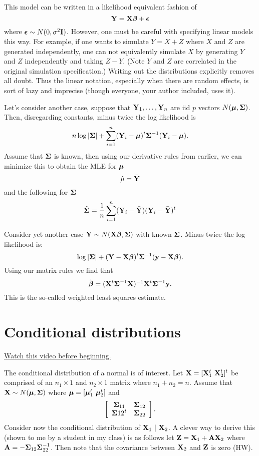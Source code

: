 This model can be written in a  likelihood equivalent fashion
of  
$$
\mathbf{Y} = \mathbf{X} \boldsymbol{\beta} + \boldsymbol{\epsilon}
$$
where $\boldsymbol{\epsilon} \sim N(0, \sigma^2 \mathbf{I})$. However, one
must be careful with specifying linear models this way.
For example, if one wants to simulate $Y = X + Z$ where $X$ and $Z$ are generated
independently, one can not equivalently simulate $X$
by generating $Y$ and $Z$ independently and taking $Z - Y$.
(Note $Y$ and $Z$ are correlated in the original simulation specification.)
Writing out the distributions explicitly removes all doubt. 
Thus the linear notation, especially when there are random effects, is sort
of lazy and imprecise (though everyone, your author included, uses it). 


Let's consider another case, suppose that $\mathbf{Y}_1, \ldots, \mathbf{Y}_n$ are iid $p$ vectors
$N(\boldsymbol{\mu}, \boldsymbol{\Sigma})$. Then, disregarding constants, minus twice the log likelihood is
$$
n \log|\boldsymbol{\Sigma}| + \sum_{i=1}^n (\mathbf{Y}_i - \boldsymbol{\mu})^t \boldsymbol{\Sigma}^{-1} (\mathbf{Y}_i - \boldsymbol{\mu}).
$$
Assume that $\boldsymbol{\Sigma}$ is known, then using our derivative rules from earlier,
we can minimize this to obtain the MLE for $\boldsymbol{\mu}$
$$
\hat \mu = \bar {\mathbf{Y}} 
$$
and the following for $\boldsymbol{\Sigma}$
$$
\hat {\boldsymbol{\Sigma}} = \frac{1}{n} \sum_{i=1}^n (\mathbf{Y}_i - \bar {\mathbf{Y}}) (\mathbf{Y}_i -\bar {\mathbf{Y}})^t
$$


Consider yet another case $\mathbf{Y} \sim N(\mathbf{X}\boldsymbol{\beta}, \boldsymbol{\Sigma})$ with known $\boldsymbol{\Sigma}$.
Minus twice the log-likelihood is:
$$
\log |\boldsymbol{\Sigma}| + (\mathbf{Y} - \mathbf{X} \boldsymbol{\beta})^t \boldsymbol{\Sigma}^{-1} (\mathbf{y} - \mathbf{X} \boldsymbol{\beta}).
$$
Using our matrix rules we find that
$$
\hat {\boldsymbol{\beta}} = (\mathbf{X}^t \boldsymbol{\Sigma}^{-1} \mathbf{X})^{-1} \mathbf{X}^t \boldsymbol{\Sigma}^{-1}\mathbf{y}. 
$$
This is the so-called weighted least squares estimate. 


\section{Conditional distributions}

\href{https://www.youtube.com/watch?v=2VTf-XNmfAk&index=47&list=PLpl-gQkQivXhdgUCdaUQcdb31CRe8Mm2y}{Watch this video before beginning.}

The conditional distribution of a normal is of interest.
Let $\mathbf{X} = [\mathbf{X}_1^t ~ \mathbf{X}_2^t]^t$ be comprised of an $n_1 \times 1$
and $n_2 \times 1$ matrix where $n_1 + n_2  = n$. Assume that
$\mathbf{X} \sim N(\boldsymbol{\mu}, \boldsymbol{\Sigma})$ where $\boldsymbol{\mu} = [\boldsymbol{\mu}_1^t ~ \boldsymbol{\mu}_2^t]$
and 
$$
\left[
\begin{array}{cc}
\boldsymbol{\Sigma}_{11} & \boldsymbol{\Sigma}_{12} \\
\boldsymbol{\Sigma}{12}^t & \boldsymbol{\Sigma}_{22}
\end{array}
\right].
$$
Consider now the conditional distribution of $\mathbf{X}_1 ~|~ \mathbf{X}_2$. 
A clever way to derive this (shown to me by a student in my class)
is as follows let $\mathbf{Z} = \mathbf{X}_1 + \mathbf{A} \mathbf{X}_2$
where $\mathbf{A} = - \boldsymbol{\Sigma}_{12}\boldsymbol{\Sigma}_{22}^{-1}$. Then note that
the covariance between $\mathbf{X}_2$ and $\mathbf{Z}$ is zero (HW).


